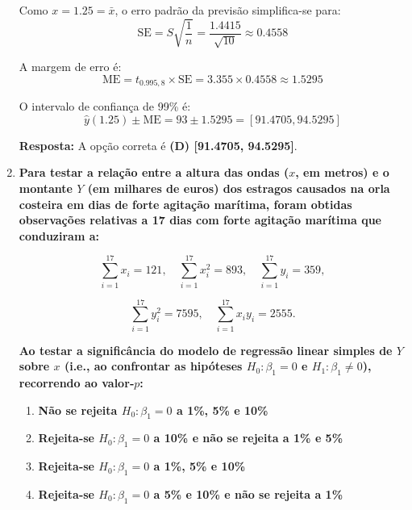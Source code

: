 \documentclass[a4paper,12pt]{article}
\begin{document}
\begin{enumerate}
\begin{mdframed}[backgroundcolor=gray!10,linewidth=0pt,innertopmargin=10pt,innerbottommargin=10pt]
    Como $x = 1.25 = \bar{x}$, o erro padrão da previsão simplifica-se para:
    \[
    \text{SE} = S \sqrt{\frac{1}{n}} = \frac{1.4415}{\sqrt{10}} \approx 0.4558
    \]

    A margem de erro é:
    \[
    \text{ME} = t_{0.995,8} \times \text{SE} = 3.355 \times 0.4558 \approx 1.5295
    \]

    O intervalo de confiança de 99\% é:
    \[
    \hat{y}(1.25) \pm \text{ME} = 93 \pm 1.5295 = [91.4705, 94.5295]
    \]

    \textbf{Resposta:} A opção correta é \textbf{(D) [91.4705, 94.5295]}.
    \end{mdframed}
    
    \vspace{0.5cm}

    \item \textbf{Para testar a relação entre a altura das ondas (\(x\), em metros) e o montante \(Y\) (em milhares de euros) dos estragos causados na orla costeira em dias de forte agitação marítima, foram obtidas observações relativas a 17 dias com forte agitação marítima que conduziram a:}

    \[
    \sum_{i=1}^{17} x_i = 121,\quad 
    \sum_{i=1}^{17} x_i^2 = 893,\quad 
    \sum_{i=1}^{17} y_i = 359,
    \]

    \[
    \sum_{i=1}^{17} y_i^2 = 7595,\quad 
    \sum_{i=1}^{17} x_i y_i = 2555.
    \]

    \textbf{Ao testar a significância do modelo de regressão linear simples de \(Y\) sobre \(x\) (i.e., ao confrontar as hipóteses \(H_0 : \beta_1 = 0\) e \(H_1 : \beta_1 \neq 0\)), recorrendo ao valor‑\(p\):}

    \vspace{0.3cm}

    \begin{enumerate}[label=\Alph*)]
        \item \textbf{Não se rejeita \(H_0 : \beta_1 = 0\) a 1\%, 5\% e 10\%}
        \item \textbf{Rejeita-se \(H_0 : \beta_1 = 0\) a 10\% e não se rejeita a 1\% e 5\%}
        \item \textbf{Rejeita-se \(H_0 : \beta_1 = 0\) a 1\%, 5\% e 10\%}
        \item \textbf{Rejeita-se \(H_0 : \beta_1 = 0\) a 5\% e 10\% e não se rejeita a 1\%}
    \end{enumerate}

    \vspace{0.3cm}


\end{enumerate}
\end{document}
